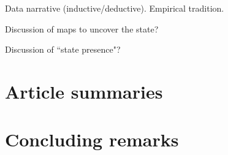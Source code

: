 \documentclass[12pt]{article}
\begin{document}
Data narrative (inductive/deductive). Empirical tradition.

Discussion of maps to uncover the state?

Discussion of ``state presence"?

\section{Article summaries} \label{Article summaries}

\section{Concluding remarks} \label{Concluding remarks}

\pagebreak



\end{document}
